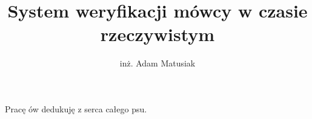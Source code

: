 \documentclass[
  printmode
]{mgr}
\title{System weryfikacji mówcy w czasie rzeczywistym}
\author{inż. Adam Matusiak}
\begin{document}


\maketitle

\dedication{6cm}{Pracę ów dedukuję z serca całego psu.}



\tableofcontents


\end{document}

